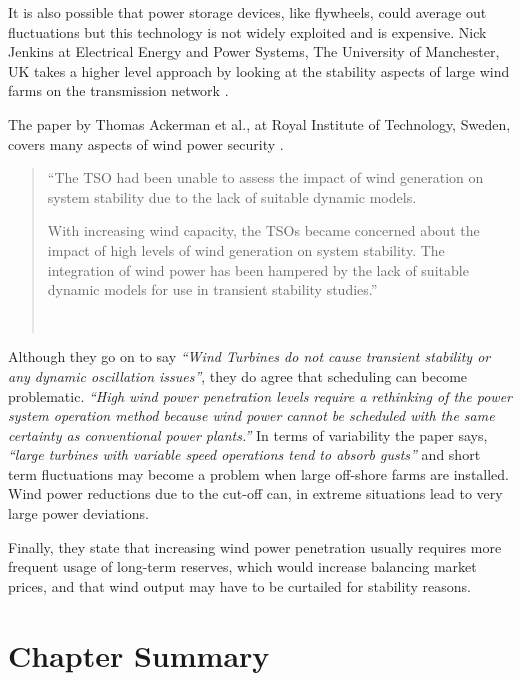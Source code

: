 \documentclass[a4paper,oneside,12pt]{report}
\newcommand{\inlinequote}[1]{\emph{``#1''}}
\newcommand{\tmpquotecite}{}%
\newenvironment{myquote}[1][]
{\renewcommand{\tmpquotecite}{#1}\begin{quote}\begin{itshape}``}
{''\end{itshape}~{\normalfont~\tmpquotecite}\end{quote}}
\begin{document}
It is also possible that power storage devices, like flywheels, could average out fluctuations but this technology is not widely exploited and is expensive. Nick Jenkins at Electrical Energy and Power Systems, The University of Manchester, UK takes a higher level approach by looking at the stability aspects of large wind farms on the transmission network \cite{Jenkins1997}.

The paper by Thomas Ackerman et al., at Royal Institute of Technology, Sweden, covers many aspects of wind power security \cite{Eriksen2005}.

\begin{myquote}[\cite{Eriksen2005}]The TSO had been unable to assess the impact of wind generation on system stability due to the lack of suitable dynamic models.

With increasing wind capacity, the TSOs became concerned about the impact of high levels of wind generation on system stability. The integration of wind power has been hampered by the lack of suitable dynamic models for use in transient stability studies.\end{myquote}

Although they go on to say \inlinequote{Wind Turbines do not cause transient stability or any dynamic oscillation issues}, they do agree that scheduling can become problematic. \inlinequote{High wind power penetration levels require a rethinking of the power system operation method because wind power cannot be scheduled with the same certainty as conventional power plants.} In terms of variability the paper says, \inlinequote{large turbines with variable speed operations tend to absorb gusts} and short term fluctuations may become a problem when large off-shore farms are installed. Wind power reductions due to the cut-off can, in extreme situations lead to very large power deviations.

Finally, they state that increasing wind power penetration usually requires more frequent usage of long-term reserves, which would increase balancing market prices, and that wind output may have to be curtailed for stability reasons.



\section{Chapter Summary}
\end{document}

